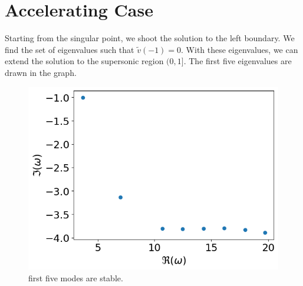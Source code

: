 \section{Accelerating Case}
Starting from the singular point, we shoot the solution to the left boundary. We find the set of eigenvalues such that $\tilde{v}(-1)=0$. With these eigenvalues, we can extend the solution to the supersonic region $(0,1]$. The first five eigenvalues are drawn in the graph.
\begin{figure} [H]
	\centering
	\includegraphics[width=0.7\linewidth]{img/numerical-experiments/accelerating-v}
	\caption{first five modes are stable.}
	\label{fig:accelerating-v}
\end{figure}

